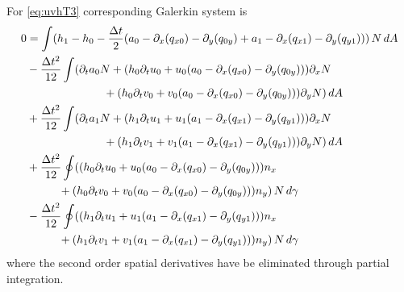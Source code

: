 \documentclass[10pt,a4paper]{book}
\newcommand{\p}{\partial}
\begin{document}
For \eqref{eq:uvhT3}
corresponding Galerkin system is
\begin{align}
\label{eq:uvhT3G}
0 &=\int( h_1-h_0 - \frac{\Delta t}{2} (a_0 -\p_x( q_{x0}) -\p_y ( q_{0y}) + a_1 -\p_x(q_{x1} ) - \p_y(q_{y1}) ) )\,N\, dA \\
&- \frac{\Delta t^2}{12} \int (  \p_t a_0 N +( h_0 \p_t u_0 + u_0 (a_0-\p_x (q_{x0})-\p_y (q_{0y}))) \p_x N \nonumber \\
&  \hspace{2.4cm} +( h_0 \p_t v_0 + v_0 (a_0-\p_x (q_{x0})-\p_y (q_{0y})))\p_y N )\, dA \nonumber \\
&+ \frac{\Delta t^2}{12} \int (  \p_t a_1 N + ( h_1 \p_t u_1 + u_1 (a_1-\p_x (q_{x1})-\p_y (q_{y1}))) \p_x N \nonumber \\
&  \hspace{2.4cm}  + ( h_1 \p_t v_1 + v_1 (a_1-\p_x (q_{x1})-\p_y (q_{y1})))\p_y N )\, dA \nonumber \\
&+ \frac{\Delta t^2}{12} \oint (( h_0 \p_t u_0 + u_0 (a_0-\p_x (q_{x0})-\p_y (q_{0y}))) n_x \nonumber \\
&  \hspace{1cm} +( h_0 \p_t v_0 + v_0 (a_0-\p_x (q_{x0})-\p_y (q_{0y}))) n_y )\, N \,d\gamma \nonumber \\
&- \frac{\Delta t^2}{12} \oint (( h_1 \p_t u_1 + u_1 (a_1-\p_x (q_{x1})-\p_y (q_{y1}))) n_x  \nonumber \\
&  \hspace{1cm}  + ( h_1 \p_t v_1 + v_1 (a_1-\p_x (q_{x1})-\p_y (q_{y1}))) n_y )\, N \, d\gamma \nonumber
\end{align}
where the second order spatial derivatives have be eliminated through partial integration.
\end{document}
